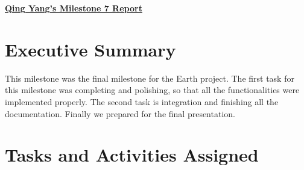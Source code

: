 \begin{center}
{\large\textbf{\underline{{Qing Yang's Milestone 7 Report}}}}
\end{center}

\section*{Executive Summary}

This milestone was the final milestone for the Earth project. The first task for this milestone was completing and polishing, so that all the functionalities were implemented properly. The second task is integration and finishing all the documentation. Finally we prepared for the final presentation.

\section*{Tasks and Activities Assigned}

